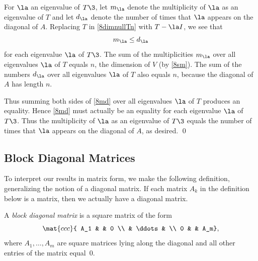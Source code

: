 For $\la$ an eigenvalue of $T\3$, let $m_{\la}$ denote the multiplicity of $\la$ as an eigenvalue of $T$ and let $d_{\la}$ denote the number of times that $\la$ appears on the diagonal of $A$. Replacing $T$ in \ref{8dimnullTn} with $T - \la I$, we see that
\begin{equation} \label{8md}
m_{\la} \le d_{\la}
\end{equation}%
for each eigenvalue $\la$ of $T\3$. The sum of the multiplicities $m_{\la}$ over all eigenvalues $\la$ of $T$ equals $n$, the dimension of $V$ (by \ref{8sm}). The sum of the numbers $d_{\la}$ over all eigenvalues $\la$ of $T$ also equals $n$, because the diagonal of $A$ has length $n$.

Thus summing both sides of \ref{8md} over all eigenvalues $\la$ of $T$ produces an equality. Hence \ref{8md} must actually be an equality for each eigenvalue $\la$ of $T\3$. Thus the multiplicity of $\la$ as an eigenvalue of $T\3$ equals the number of times that $\la$ appears on the diagonal of $A$, as desired.
\qed

\subsection{Block Diagonal Matrices}


To interpret our results in matrix form, we make the following definition, generalizing the notion of a diagonal matrix.
If each matrix $A_k$ in the definition below is a  matrix, then we actually have a diagonal matrix.

{A \emph{block diagonal matrix} is a square
matrix of the form
\[
\mat{ccc}{
A_1 & & 0 \\
& \ddots & \\
0 & & A_m},
\]
where $A_1, \dots, A_m$ are square matrices lying along the diagonal and all other entries of the matrix equal~$0$.}

